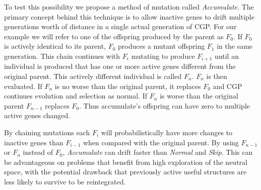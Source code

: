 \documentclass[runningheads,a4paper]{llncs}
\begin{document}
To test this possibility we propose a method of mutation called \emph{Accumulate}.
The primary concept behind this technique is to allow inactive genes to drift
multiple generations worth of distance in a single actual generation of CGP.
For our example we will refer to one of the offspring produced by the parent as $F_0$.  If $F_0$
is actively identical to its parent, $F_0$ produces a mutant offspring $F_1$ in the same generation.
This chain continues with $F_i$ mutating to produce $F_{i+1}$ until an individual
is produced that has one or more active genes different from the original parent.
This actively different individual is called $F_n$.  $F_n$ is then evaluated.
If $F_n$ is no worse than the original parent, it replaces $F_0$ and CGP continues
evolution and selection as normal.  If $F_n$ is worse than the original parent
$F_{n-1}$ replaces $F_0$.  Thus accumulate's offspring can have zero to multiple
active genes changed.

By chaining mutations each $F_i$ will probabilistically have more changes to
inactive genes than $F_{i-1}$ when compared with the original parent.  By using
$F_{n-1}$ or $F_n$ instead of $F_0$, \emph{Accumulate} can drift faster than
\emph{Normal} and \emph{Skip}.  This can be advantageous on problems that benefit
from high exploration of the neutral space, with the potential drawback that
previously active useful structures are less likely to survive to be reintegrated.
\end{document}
